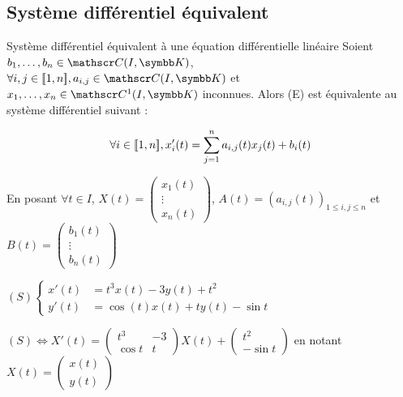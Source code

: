 \subsection{Système différentiel équivalent}

\begin{propositionnt}{Système différentiel équivalent à une équation différentielle linéaire}{}
    Soient $b_1, \dots, b_n \in \mathscr C(I, \K)$, 
    $\forall i, j \in \ninter{1}{n}, a_{i,j} \in \mathscr C(I, \K)$
    et $x_1, \dots, x_n \in \mathscr C^1(I, \K)$ inconnues. Alors (E) est équivalente au système différentiel suivant :
    
    $$\forall i \in [\![1, n]\!], x_i'(t) = \sum_{j=1}^n a_{i,j}(t)x_j(t) + b_i(t)$$

    En posant $\forall t \in I$, $X(t) = \begin{pmatrix}
        x_1(t) \\ \vdots \\ x_n(t)
    \end{pmatrix}$, $A(t) = (a_{i, j}(t))_{1 \leq i, j \leq n}$ et $B(t) = \begin{pmatrix}
        b_1(t) \\ \vdots \\ b_n(t)
    \end{pmatrix}$
\end{propositionnt}

\begin{exemple}
    $(S) \begin{cases}
        x'(t) & = t^3 x(t) - 3y(t) + t^2 \\
        y'(t) & = \cos(t) x(t) + t y(t) - \sin t 
    \end{cases}$

    $(S) \Leftrightarrow X'(t) = \begin{pmatrix}
        t^3 & -3 \\
        \cos t & t 
     \end{pmatrix} X(t) + \begin{pmatrix}
        t^2 \\ -\sin t
     \end{pmatrix}$
     en notant $X(t) = \begin{pmatrix}
        x(t) \\ y(t)
    \end{pmatrix}$
\end{exemple}

